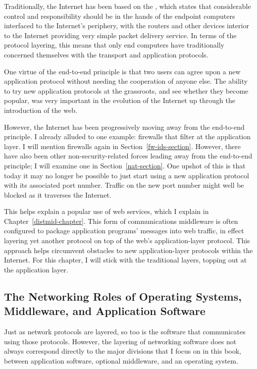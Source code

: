 Traditionally, the Internet has been based on the , which states that considerable control and responsibility
should be in the hands of the endpoint computers interfaced to the
Internet's periphery, with the routers and other devices interior to
the Internet providing very simple packet delivery service.  In terms
of the protocol layering, this means that only end computers have
traditionally concerned themselves with the transport and application
protocols.

One virtue of the end-to-end principle is that two users can agree
upon a new application protocol without needing the cooperation of
anyone else.  The ability to try
new application protocols at the grassroots, and see whether they
become popular, was very important in the evolution of the Internet up
through the introduction of the web.

However, the Internet has been progressively moving away from the
end-to-end principle.  I already alluded to one example: firewalls
that filter at the application layer.  I will mention firewalls again
in Section~\ref{fw-ids-section}.  However, there have also been other
non-security-related forces leading away from the end-to-end
principle; I will examine one in Section~\ref{nat-section}.  One upshot
of this is that today it may no longer be possible to just start
using a new application protocol with its associated port number.
Traffic on the new port number might well be blocked as it traverses
the Internet.

This helps explain a popular use of web services, which I explain in
Chapter~\ref{distmid-chapter}.  This form of communications middleware
is often configured to package application programs' messages into
web traffic, in effect layering yet another protocol on top of
the web's application-layer protocol.  This approach helps circumvent obstacles to
new application-layer protocols within the Internet.  For this
chapter, I will stick with the traditional layers, topping out at the
application layer.

\subsection{The Networking Roles of Operating Systems, Middleware, and Application
  Software}

Just as network protocols are layered, so too is the software that
communicates using those protocols.  However, the layering of
networking software does not always correspond directly to the major
divisions that I focus on in this book, between application software,
optional middleware, and an operating system.

